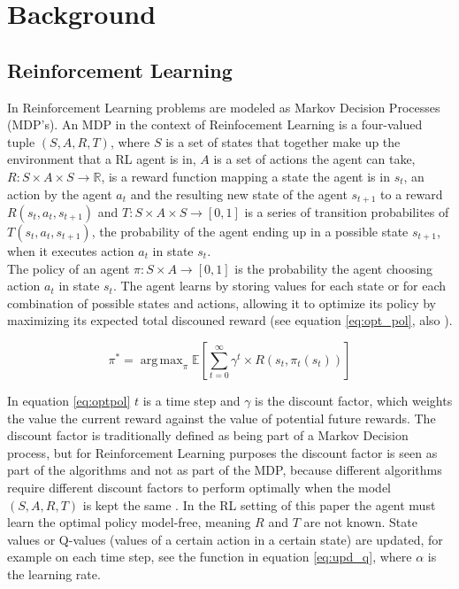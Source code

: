 
\section{Background}

\subsection{Reinforcement Learning}

In Reinforcement Learning problems are modeled as Markov Decision Processes (MDP's). An MDP in the context of Reinfocement Learning
is a four-valued tuple $(S,A,R,T)$, where $S$ is a set of states that together make up the environment that a RL agent is in,
 $A$ is a set of actions the agent can take, $R: S \times A \times S \rightarrow \mathbb{R}$, is a reward function mapping a state the agent is in $s_t$,
 an action by the agent $a_t$ and the resulting new state of the agent $s_{t+1}$ to a reward $R(s_t,a_t,s_{t+1})$
 and $T: S \times A \times S \rightarrow [0,1]$ is a series of transition probabilites of $T(s_t,a_t,s_{t+1})$, the probability of the agent
 ending up in a possible state $s_{t+1}$, when it executes action $a_t$ in state $s_t$. \\
 The policy of an agent $\pi: S \times A \rightarrow [0,1]$ is the probability the agent choosing action $a_t$ in state $s_t$. The agent learns by storing values for each
 state or for each combination of possible states and actions, allowing it to optimize its policy by maximizing its expected total discouned reward
 (see equation \ref{eq:opt_pol}, also \cite{zimmer2016neural}).

\begin{equation}
\label{eq:opt_pol}
\pi^* = \operatorname{arg\,max}_{\pi} \mathbb{E}\left [ \sum_{t = 0}^{\infty}\gamma^{t} \times R(s_t,\pi_t(s_t))\right ]
\end{equation}

In equation \eqref{eq:optpol} $t$ is a time step and $\gamma$ is the discount factor, which weights the value the current reward against the value of potential future rewards.
The discount factor is traditionally defined as being part of a Markov Decision process, but for Reinforcement Learning purposes the discount factor is seen as part
of the algorithms and not as part of the MDP, because different algorithms require different discount factors to perform optimally when the model
$(S,A,R,T)$ is kept the same \cite{van2007reinforcement}. In the RL setting of this paper the agent must learn the optimal policy model-free, meaning $R$ and $T$ are not known.
State values or Q-values (values of a certain action in a certain state) are updated, for example on each time step, see the function in equation \ref{eq:upd_q}, where $\alpha$ is the learning rate.

